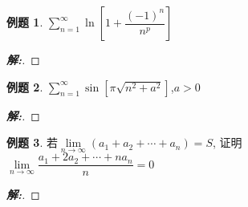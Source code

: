 \documentclass[12pt,a4paper]{ctexart}
\newenvironment{solution}{\begin{proof}[\hspace{2em}\textbf{解:}]}{\end{proof}}
\theoremstyle{definition}%
\newtheorem{exercise}{\hspace{2em}例题}
\begin{document}
\begin{exercise}
	$ \displaystyle\sum_{n=1}^{\infty} \ln[1+\dfrac{(-1)^n}{n^p}] $
\end{exercise}
\begin{solution}
	
\end{solution}

\begin{exercise}
	$ \displaystyle\sum_{n=1}^{\infty} \sin[\pi\sqrt{n^2+a^2}] $,$ a>0 $
\end{exercise}
\begin{solution}
	
\end{solution}

\begin{exercise}
	若$ \lim\limits_{n \to \infty}(a_1+a_2+\cdots+a_n)=S $, 证明\\
	
	$ \lim\limits_{n \to \infty}\dfrac{a_1+2a_2+\cdots+na_n}{n}=0 $
\end{exercise}
\begin{solution}
	
\end{solution}
\end{document}
